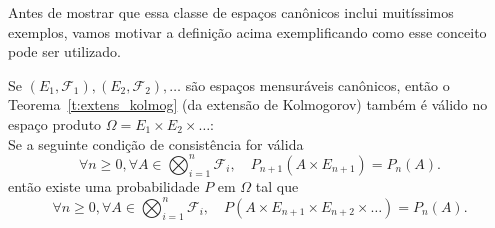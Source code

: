 Antes de mostrar que essa classe de espaços canônicos inclui muitíssimos exemplos, vamos motivar a definição acima exemplificando como esse conceito pode ser utilizado.

\begin{theorem}
  Se $(E_1,\mathcal{F}_1), (E_2,\mathcal{F}_2), \dots$ são espaços mensuráveis canônicos, então o Teorema~\ref{t:extens_kolmog} (da extensão de Kolmogorov)
  também é válido no espaço produto $\Omega = E_1 \times E_2 \times \dots$: \\
  Se a seguinte condição de consistência for válida
  \begin{equation}
   \forall n\ge 0, \forall A \in \bigotimes_{i=1}^n \mathcal{F}_i,\quad P_{n+1}(A\times E_{n+1})=P_n(A).
  \end{equation}
então existe uma probabilidade $P$ em $\Omega$ tal que
    \begin{equation}
   \forall n\ge 0, \forall A \in \bigotimes_{i=1}^n \mathcal{F}_i,\quad P(A\times E_{n+1}\times E_{n+2}\times\dots )=P_n(A).
  \end{equation}
\end{theorem}

